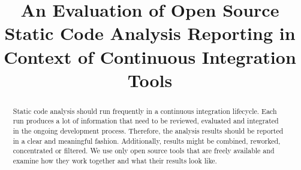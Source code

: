 \documentclass[conference]{IEEEtran}
\begin{document}
%
\title{An Evaluation of Open Source Static Code Analysis Reporting in Context of Continuous Integration Tools}






\author{
	}








\maketitle


\begin{abstract}
Static code analysis should run frequently in a continuous integration lifecycle. Each run produces a lot of information that need to be reviewed, evaluated and integrated in the ongoing development process. Therefore, the analysis results should be reported in a clear and meaningful fashion. Additionally, results might be combined, reworked, concentrated or filtered. We use only open source tools that are freely available and examine how they work together and what their results look like.
\end{abstract}


\IEEEpeerreviewmaketitle
\end{document}
